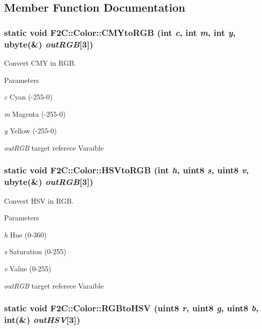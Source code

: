 \subsection{Member Function Documentation}
\hypertarget{class_f2_c_1_1_color_a341fb0d5aace06580016fd4a3070df5c}{
\subsubsection[{CMYtoRGB}]{\setlength{\rightskip}{0pt plus 5cm}static void F2C::Color::CMYtoRGB (int {\em c}, \/  int {\em m}, \/  int {\em y}, \/  {\bf ubyte}(\&) {\em outRGB}\mbox{[}3\mbox{]})}}
\label{class_f2_c_1_1_color_a341fb0d5aace06580016fd4a3070df5c}


Convert CMY in RGB. 
\begin{DoxyParams}{Parameters}
\item[{\em c}]Cyan (-\/255-\/0) \item[{\em m}]Magenta (-\/255-\/0) \item[{\em y}]Yellow (-\/255-\/0) \item[{\em outRGB}]target referece Varaible \end{DoxyParams}
\hypertarget{class_f2_c_1_1_color_ab0188ae140cb5fe9c4279144590c8ec8}{
\subsubsection[{HSVtoRGB}]{\setlength{\rightskip}{0pt plus 5cm}static void F2C::Color::HSVtoRGB (int {\em h}, \/  {\bf uint8} {\em s}, \/  {\bf uint8} {\em v}, \/  {\bf ubyte}(\&) {\em outRGB}\mbox{[}3\mbox{]})}}
\label{class_f2_c_1_1_color_ab0188ae140cb5fe9c4279144590c8ec8}


Convert HSV in RGB. 
\begin{DoxyParams}{Parameters}
\item[{\em h}]Hue (0-\/360) \item[{\em s}]Saturation (0-\/255) \item[{\em v}]Value (0-\/255) \item[{\em outRGB}]target referece Varaible \end{DoxyParams}
\hypertarget{class_f2_c_1_1_color_a3e133155389e2797f3bce82c5edf8345}{
\subsubsection[{RGBtoHSV}]{\setlength{\rightskip}{0pt plus 5cm}static void F2C::Color::RGBtoHSV ({\bf uint8} {\em r}, \/  {\bf uint8} {\em g}, \/  {\bf uint8} {\em b}, \/  int(\&) {\em outHSV}\mbox{[}3\mbox{]})}}
\label{class_f2_c_1_1_color_a3e133155389e2797f3bce82c5edf8345}


